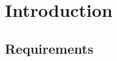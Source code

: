 \documentclass[12pt]{article}
\begin{document}

\tableofcontents

\section{Introduction}


\subsection{Requirements}

\end{document}
